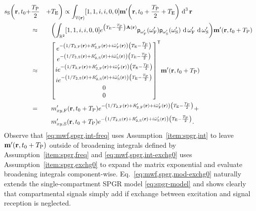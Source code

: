 \begin{alignat}{2}
	\spgr\bigg(\bmr,t_0+
		&\frac{\TP}{2}&
		+ &\TE\bigg) \propto
			\int_{\setV\pr} \brac{1, 1, i, i, 0, 0} \bmmp\paren{\bmr,t_0+\frac{\TP}{2}+\TE} \dercubed{\bmr} 
			\label{eq:mwf,spgr,int} \\
		&\approx& 
			&\paren{\int_{\real^2} \brac{1, 1, i, i, 0, 0}
				e^{\paren{\TE-\frac{\TP}{2}}\bmA\pr} 
				\dista{\ompf} \dista{\omps} \der{\ompf} \der{\omps}} 
				\bmmp\paren{\bmr,t_0+\TP} 
				\label{eq:mwf,spgr,int-freq} \\
		&\approx&
			&\begin{bmatrix}
				e^{-\paren{1/\tf{2}\pr+\Rtpf\pr+i\ompfmed\pr}\paren{\TE-\frac{\TP}{2}}} \\
				e^{-\paren{1/\ts{2}\pr+\Rtps\pr+i\ompsmed\pr}\paren{\TE-\frac{\TP}{2}}} \\
				ie^{-\paren{1/\tf{2}\pr+\Rtpf\pr+i\ompfmed\pr}\paren{\TE-\frac{\TP}{2}}} \\
				ie^{-\paren{1/\ts{2}\pr+\Rtps\pr+i\ompsmed\pr}\paren{\TE-\frac{\TP}{2}}} \\
				0 \\
				0
			\end{bmatrix}
			\tpose \bmmp\paren{\bmr,t_0+\TP}
			\label{eq:mwf,spgr,int-exchg0} \\
		&=\,& 
			&\mxypf\paren{\bmr,t_0+\TP} 
				e^{-\paren{1/\tf{2}\pr+\Rtpf\pr+i\ompfmed\pr}\paren{\TE-\frac{\TP}{2}}} +
				\nonumber \\
		&& 
			&\mxyps\paren{\bmr,t_0+\TP} 
				e^{-\paren{1/\ts{2}\pr+\Rtps\pr+i\ompsmed\pr}\paren{\TE-\frac{\TP}{2}}}.
			\label{eq:mwf,spgr,mod-exchg0}
\end{alignat}
Observe that \eqref{eq:mwf,spgr,int-freq}
uses Assumption~\ref{item:spgr,int}
to leave $\bmmp\paren{\bmr,t_0+\TP}$
outside of broadening integrals
defined by Assumption~\ref{item:spgr,freq}
and 
\eqref{eq:mwf,spgr,int-exchg0}
uses Assumption~\ref{item:spgr,exchg0}
to expand the matrix exponential
and evaluate broadening integrals component-wise.
Eq.~\eqref{eq:mwf,spgr,mod-exchg0} naturally extends
the single-compartment SPGR model \eqref{eq:spgr-model} 
and shows clearly
that compartmental signals simply add
if exchange between excitation and signal reception is neglected. 

